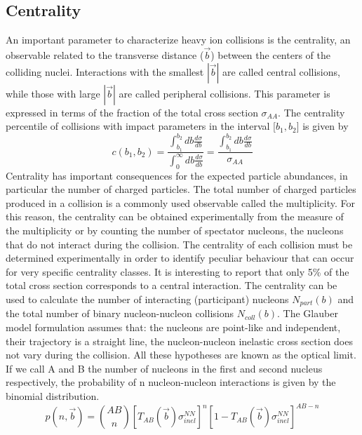 \documentclass[12pt,a4paper]{book}
\begin{document}
	\subsection{Centrality}
	An important parameter to characterize heavy ion collisions is the centrality, an observable related to the transverse distance ($\vec{b}$) between the centers of the colliding nuclei. Interactions with the smallest $|\vec{b}|$ are called central collisions, while those with large $|\vec{b}|$ are called peripheral collisions. This parameter is expressed in terms of the fraction of the total cross section $\sigma_{AA}$. The centrality percentile of collisions with impact parameters in the interval [$b_1,b_2$] is given by
	\begin{equation}
		c(b_1,b_2)=\frac{\int_{b_1}^{b_2} db \frac{d\sigma}{db}}{\int_{0}^{\infty} db \frac{d\sigma}{db}} = \frac{\int_{b_1}^{b_2} db \frac{d\sigma}{db}}{\sigma_{AA}}
		\label{eq:centrrality1}
	\end{equation}
	Centrality has important consequences for the expected particle abundances, in particular the number of charged particles. The total number of charged particles produced in a collision is a commonly used observable called the multiplicity. For this reason, the centrality can be obtained experimentally from the measure of the multiplicity or by counting the number of spectator nucleons, the nucleons that do not interact during the collision. The centrality of each collision must be determined experimentally in order to identify peculiar behaviour that can occur for very specific centrality classes. It is interesting to report that only 5\% of the total cross section corresponds to a central interaction. \cite{amsdottorato9036}
	The centrality can be used to calculate the number of interacting (participant) nucleons $N_{part}(b)$ and the total number of binary nucleon-nucleon collisions $N_{coll}(b)$. The Glauber model formulation \cite{Miller_2007} assumes that: the nucleons are point-like and independent, their trajectory is a straight line, the nucleon-nucleon inelastic cross section does not vary during the collision. All these hypotheses are known as the optical limit. If we call A and B the number of nucleons in the first and second nucleus respectively, the probability of n nucleon-nucleon interactions is given by the binomial distribution.
	\begin{equation}
		p(n,\vec{b})= \binom{AB}{n} \left[T_{AB}(\vec{b}) \sigma_{inel}^{NN}\right]^n \left[1-T_{AB}(\vec{b}) \sigma_{inel}^{NN}\right]^{AB-n}
		\label{eq:prob_interaction}
	\end{equation}
\end{document}

